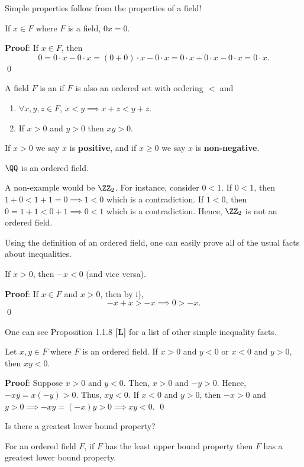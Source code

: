 Simple properties follow from the properties of a field!
\begin{theorem}
If $x\in F$ where $F$ is a field, $0x=0.$
\end{theorem}
\textbf{Proof}: If $x\in F$, then
\[
0 = 0\cdot x -0\cdot x = (0+0)\cdot x -0\cdot x = 0\cdot x+0\cdot x -0\cdot x = 0\cdot x.
\]
\qed 

\begin{definition}
A field $F$ is an  if $F$ is also an ordered set with ordering $<$ and 
\begin{enumerate}[label = \roman*)]
    \item $\forall x,y,z\in F$, $x<y\implies x+z<y+z$.
    \item If $x>0$ and $y>0$ then $xy>0$.
\end{enumerate}
If $x>0$ we say $x$ is \textbf{positive}, and if $x\geq 0$ we say $x$ is \textbf{non-negative}.
\end{definition}

\begin{example}
$\QQ$ is an ordered field.
\end{example}

A non-example would be $\ZZ_2$. For instance, consider $0<1$. If $0<1$, then $1+0<1+1 = 0\implies 1<0$ which is a contradiction. If $1<0$, then $0=1+1<0+1 \implies 0<1$ which is a contradiction. Hence, $\ZZ_2$ is not an ordered field.

Using the definition of an ordered field, one can easily prove all of the usual facts about inequalities.
\begin{theorem}
If $x>0$, then $-x<0$ (and vice versa).
\end{theorem}
\textbf{Proof}: If $x\in F$ and $x>0$, then by i),
\[
-x+x>-x \implies 0>-x.
\]\qed 

One can see Proposition 1.1.8 \textbf{[L]} for a list of other simple inequality facts.

\begin{theorem}
Let $x,y\in F$ where $F$ is an ordered field. If $x>0$ and $y<0$ or $x<0$ and $y>0$, then $xy<0$.
\end{theorem}
\textbf{Proof}: Suppose $x>0$ and $y<0$. Then, $x>0$ and $-y>0$. Hence, $-xy = x(-y)>0$. Thus, $xy<0$. If $x<0$ and $y>0$, then $-x>0$ and $y>0\implies -xy = (-x)y>0 \implies xy<0.$ \qed

\begin{question}
Is there a greatest lower bound property? %
\end{question}
For an ordered field $F$, if $F$ has the least upper bound  property then $F$ has a greatest lower bound property.

